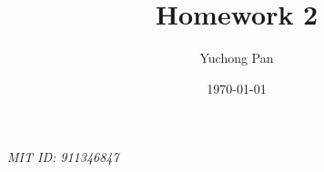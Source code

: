\documentclass[letterpaper, reqno,11pt]{article}
\begin{document}
\title{Homework 2}
\author{Yuchong Pan}
\date{\today}
\newtheorem{theorem}{Theorem}
\newtheorem{lemma}[theorem]{Lemma}
\newtheorem{corollary}[theorem]{Corollary}
\newtheorem{fact}[theorem]{Fact}
\newtheorem{proposition}[theorem]{Proposition}
\newtheorem{claim}{Claim}
\newtheorem{exercise}{Exercise}
\theoremstyle{definition}
\newtheorem{definition}[theorem]{Definition}
\newtheorem{solution}{Solution}
%

\begin{framed}
 \hfill \thedate
\begin{center}
\Large{\thetitle}
\end{center}
 \hfill {\em MIT ID: 911346847}
\end{framed}
\end{document}
